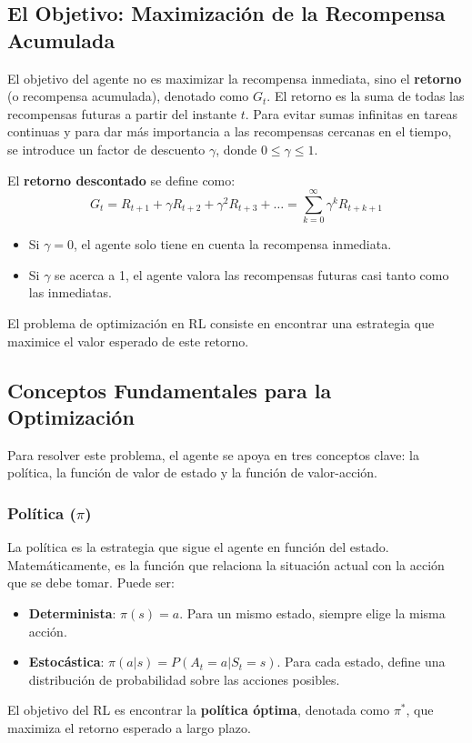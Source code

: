 \documentclass[12pt,a4paper]{book}
\begin{document}
\hrulefill

\subsection{El Objetivo: Maximización de la Recompensa Acumulada}

El objetivo del agente no es maximizar la recompensa inmediata, sino el \textbf{retorno} (o recompensa acumulada), denotado como $G_t$. El retorno es la suma de todas las recompensas futuras a partir del instante $t$. Para evitar sumas infinitas en tareas continuas y para dar más importancia a las recompensas cercanas en el tiempo, se introduce un factor de descuento $\gamma$, donde $0 \le \gamma \le 1$.

El \textbf{retorno descontado} se define como:
\[ G_t = R_{t+1} + \gamma R_{t+2} + \gamma^2 R_{t+3} + \dots = \sum_{k=0}^{\infty} \gamma^k R_{t+k+1} \]

\begin{itemize}
    \item Si $\gamma = 0$, el agente solo tiene en cuenta la recompensa inmediata.
    \item Si $\gamma$ se acerca a 1, el agente valora las recompensas futuras casi tanto como las inmediatas.
\end{itemize}

El problema de optimización en RL consiste en encontrar una estrategia que maximice el valor esperado de este retorno.

\hrulefill

\subsection{Conceptos Fundamentales para la Optimización}

Para resolver este problema, el agente se apoya en tres conceptos clave: la política, la función de valor de estado y la función de valor-acción.

\subsubsection{Política ($\pi$)}
La política es la estrategia que sigue el agente en función del estado. Matemáticamente, es la función que relaciona la situación actual con la acción que se debe tomar. Puede ser:
\begin{itemize}
    \item \textbf{Determinista}: $\pi(s) = a$. Para un mismo estado, siempre elige la misma acción.
    \item \textbf{Estocástica}: $\pi(a|s) = P(A_t = a | S_t = s)$. Para cada estado, define una distribución de probabilidad sobre las acciones posibles.
\end{itemize}
El objetivo del RL es encontrar la \textbf{política óptima}, denotada como $\pi^*$, que maximiza el retorno esperado a largo plazo.
\end{document}
